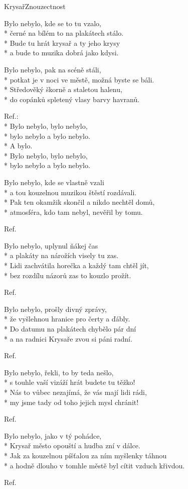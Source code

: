 \documentclass[10.5pt]{book}
\newcommand\tab[1][1cm]{\hspace*{#1}}
\begin{document}
\begin{poem}{Krysař}{Znouzectnost}

\settowidth{\versewidth}{a hodně dlouho v tomhle městě byl cítit vzduch křivdou.}

Bylo nebylo, kde se to tu vzalo,\\*
černé na bílém to na plakátech stálo.\\*
Bude tu hrát krysař a ty jeho krysy\\*
a bude to muzika dobrá jako kdysi.

Bylo nebylo, pak na scéně stáli,\\*
potkat je v noci ve městě, možná byste se báli.\\*
Středověký škorně a staletou halenu,\\*
do copánků spletený vlasy barvy havranů.

Ref.:\\*
Bylo nebylo, bylo nebylo,\\*
bylo nebylo a bylo nebylo.\\*
\tab A bylo. \\*
Bylo nebylo, bylo nebylo,\\*
bylo nebylo a bylo nebylo.

Bylo nebylo, kde se vlastně vzali\\*
a tou kouzelnou muzikou štěstí rozdávali.\\*
Pak ten okamžik skončil a nikdo nechtěl domů,\\*
atmosféra, kdo tam nebyl, nevěřil by tomu.

Ref.

Bylo nebylo, uplynul ňákej čas\\*
a plakáty na nárožích visely tu zas.\\*
Lidi zachvátila horečka a každý tam chtěl jít,\\*
bez rozdílu názorů zas to kouzlo prožít.

Ref.

Bylo nebylo, prošly divný zprávy,\\*
že vyšlehnou hranice pro čerty a ďábly.\\*
Do datumu na plakátech chybělo pár dní\\*
a na radnici Krysaře zvou si páni radní.

Ref.

Bylo nebylo, řekli, to by teda nešlo,\\*
s touhle vaší vizáží hrát budete tu těžko!\\*
Nás to vůbec nezajímá, že vás mají lidi rádi,\\*
my jsme tady od toho jejich mysl chránit!

Ref.

Bylo nebylo, jako v tý pohádce,\\*
Krysař město opouští a hudba zní v dálce.\\*
Jak za kouzelnou píšťalou za ním myšlenky táhnou\\*
a hodně dlouho v tomhle městě byl cítit vzduch křivdou.

Ref.
\end{poem}
\end{document}
